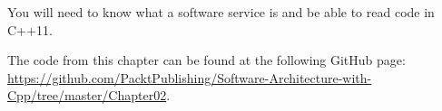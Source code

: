 You will need to know what a software service is and be able to read code in C++11.

The code from this chapter can be found at the following GitHub page: \url{https://github.com/PacktPublishing/Software-Architecture-with-Cpp/tree/master/Chapter02}.